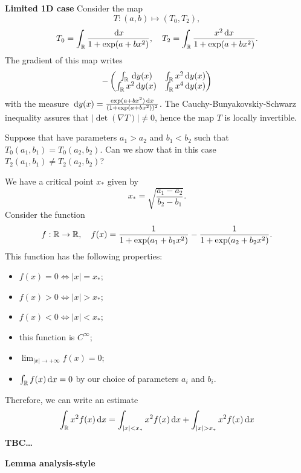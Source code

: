 \documentclass{article}
\begin{document}
\textbf{Limited 1D case}
Consider the map
\[
	T:(a,b)\mapsto (T_0,T_2),
\]
\[
	T_0 = \int_{{\mathbb R}}^{}\frac{{\,\mathrm{d} x}}{1+\exp(a+bx^2)},\quad T_2=\int_{{\mathbb R}}^{}\frac{x^2{\,\mathrm{d} x}}{1+\exp(a+bx^2)}.
\]
The gradient of this map writes
\[
	-\begin{pmatrix}
		\int_{\mbo}^{}\dy(x)&\int_{\mbo}^{}x^2\dy(x)\\\int_{\mbo}^{}x^2\dy(x)&\int_{\mbo}^{}x^4\dy(x)
	\end{pmatrix}
%
\]
with the measure ${\,\mathrm dy}(x)=\frac{\exp(a+bx^2){\,\mathrm{d} x}}{(1+\exp(a+bx^2))^2}$. The Cauchy-Bunyakovskiy-Schwarz inequality assures that $|\det(\nabla T)|\ne0$, hence the map $T$ is locally invertible.

Suppose that have parameters $a_1>a_2$ and $b_1<b_2$ such that
$T_0(a_1,b_1)=T_0(a_2,b_2)$. Can we show that in this case $T_2(a_1,b_1)\ne T_2(a_2,b_2)$?

We have a critical point $x_*$ given by
\[
	x_*=\sqrt{\frac{a_1-a_2}{b_2-b_1}}.
\]
Consider the function \[
	f:\mbo\to\mbo,\quad f(x) = \frac{1}{1+\exp(a_1+b_1x^2)}-\frac{1}{1+\exp(a_2+b_2x^2)}.
%
\]
This function has the following properties:
\begin{itemize}
	\item $f(x)=0\iff |x|=x_*$;
	\item $f(x)>0\iff |x|>x_*$;
	\item $f(x)<0\iff |x|<x_*$;
	\item this function is $C^{\infty}$;
	\item $\lim_{|x|\to +\infty}f(x)=0$;
	\item $\int_{{\mathbb R}}^{}f(x){\,\mathrm{d} x}=0$ by our choice of parameters $a_i$ and $b_i$.
\end{itemize}

Therefore, we can write an estimate
\[
	\int_{\mbo}^{}x^2f(x)\dx = \int_{|x|<x_*}^{}x^2f(x)\dx + \int_{|x|>x_*}^{}x^2f(x)\dx
\]\textbf{TBC\dots}

\textbf{Lemma analysis-style}
\end{document}
